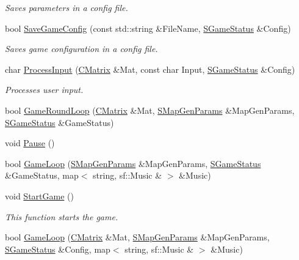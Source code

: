 \begin{DoxyCompactItemize}
\begin{DoxyCompactList}\small\item\em Saves parameters in a config file. \end{DoxyCompactList}\item 
bool \hyperlink{namespace_chase_game_a561c85a018e34c8baa21f7f500a3c9c7}{Save\-Game\-Config} (const std\-::string \&File\-Name, \hyperlink{struct_chase_game_1_1_s_game_status}{S\-Game\-Status} \&Config)
\begin{DoxyCompactList}\small\item\em Saves game configuration in a config file. \end{DoxyCompactList}\item 
char \hyperlink{namespace_chase_game_ab5112517855da810fe3b7bdb81d58484}{Process\-Input} (\hyperlink{namespace_chase_game_a469449f9237e59efce3982127366c550}{C\-Matrix} \&Mat, const char Input, \hyperlink{struct_chase_game_1_1_s_game_status}{S\-Game\-Status} \&Config)
\begin{DoxyCompactList}\small\item\em Processes user input. \end{DoxyCompactList}\item 
bool \hyperlink{namespace_chase_game_acb136d1f2b7073d2dc61bc2e2d65b931}{Game\-Round\-Loop} (\hyperlink{namespace_chase_game_a469449f9237e59efce3982127366c550}{C\-Matrix} \&Mat, \hyperlink{struct_chase_game_1_1_s_map_gen_params}{S\-Map\-Gen\-Params} \&Map\-Gen\-Params, \hyperlink{struct_chase_game_1_1_s_game_status}{S\-Game\-Status} \&Game\-Status)
\item 
void \hyperlink{namespace_chase_game_aaaedf9429ec62c336f4324d580eec51c}{Pause} ()
\item 
bool \hyperlink{namespace_chase_game_a1ca6f3f9092b35d9bea0343fd032d7f0}{Game\-Loop} (\hyperlink{struct_chase_game_1_1_s_map_gen_params}{S\-Map\-Gen\-Params} \&Map\-Gen\-Params, \hyperlink{struct_chase_game_1_1_s_game_status}{S\-Game\-Status} \&Game\-Status, map$<$ string, sf\-::\-Music \& $>$ \&Music)
\item 
void \hyperlink{namespace_chase_game_a528073d13296b3cf84a6ae07c3550e74}{Start\-Game} ()
\begin{DoxyCompactList}\small\item\em This function starts the game. \end{DoxyCompactList}\item 
bool \hyperlink{namespace_chase_game_a978204f0ec269a6fa5f43bb523d84e57}{Game\-Loop} (\hyperlink{namespace_chase_game_a469449f9237e59efce3982127366c550}{C\-Matrix} \&Mat, \hyperlink{struct_chase_game_1_1_s_map_gen_params}{S\-Map\-Gen\-Params} \&Map\-Gen\-Params, \hyperlink{struct_chase_game_1_1_s_game_status}{S\-Game\-Status} \&Config, map$<$ string, sf\-::\-Music \& $>$ \&Music)

\end{DoxyCompactItemize}
